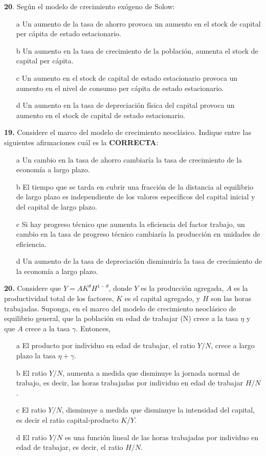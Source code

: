 \documentclass{nuevotema}
\begin{document}

\textbf{20}. Según el modelo de crecimiento exógeno de Solow:
\begin{enumerate}
    \item[a] Un aumento de la tasa de ahorro provoca un aumento en el stock de capital per cápita de estado estacionario.
    \item[b] Un aumento en la tasa de crecimiento de la población, aumenta el stock de capital per cápita.
    \item[c] Un aumento en el stock de capital de estado estacionario provoca un aumento en el nivel de consumo per cápita de estado estacionario.
    \item[d] Un aumento en la tasa de depreciación física del capital provoca un aumento en el stock de capital de estado estacionario.
\end{enumerate}


\textbf{19.} Considere el marco del modelo de crecimiento neoclásico. Indique entre las siguientes afirmaciones cuál es la \textbf{CORRECTA}:

\begin{itemize}
	\item[a] Un cambio en la tasa de ahorro cambiaría la tasa de crecimiento de la economía a largo plazo.
	\item[b] El tiempo que se tarda en cubrir una fracción de la distancia al equilibrio de largo plazo es independiente de los valores específicos del capital inicial y del capital de largo plazo.
	\item[c] Si hay progreso técnico que aumenta la eficiencia del factor trabajo, un cambio en la tasa de progreso técnico cambiaría la producción en unidades de eficiencia.
	\item[d] Un aumento de la tasa de depreciación disminuiría la tasa de crecimiento de la economía a largo plazo.
\end{itemize}

\textbf{20.} Considere que $Y = AK^\theta H^{1-\theta}$, donde $Y$ es la producción agregada, $A$ es la productividad total de los factores, $K$ es el capital agregado, y $H$ son las horas trabajadas. Suponga, en el marco del modelo de crecimiento neoclásico de equilibrio general, que la población en edad de trabajar (N) crece a la tasa $\eta$ y que $A$ crece a la tasa $\gamma$. Entonces, 

\begin{itemize}
	\item[a] El producto por individuo en edad de trabajar, el ratio $Y/N$, crece a largo plazo la tasa $\eta+\gamma$.
	\item[b] El ratio $Y/N$, aumenta a medida que disminuye la jornada normal de trabajo, es decir, las horas trabajadas por individuo en edad de trabajar $H/N$.
	\item[c] El ratio $Y/N$, disminuye a medida que disminuye la intensidad del capital, es decir el ratio capital-producto $K/Y$.
	\item[d] El ratio $Y/N$ es una función lineal de las horas trabajadas por individuo en edad de trabajar, es decir, el ratio $H/N$.
\end{itemize}
\end{document}
